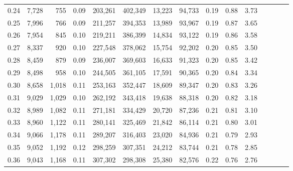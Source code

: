 \begin{tabular}{rrrcrrrrrrrrrrr}
0.24 &   7,728 &     755 &                                       0.09 &  203,261 &  402,349 &   13,223 &   94,733 &  0.19 &  0.88 &                         3.73 \\
0.25 &   7,996 &     766 &                                       0.09 &  211,257 &  394,353 &   13,989 &   93,967 &  0.19 &  0.87 &                         3.65 \\
0.26 &   7,954 &     845 &                                       0.10 &  219,211 &  386,399 &   14,834 &   93,122 &  0.19 &  0.86 &                         3.58 \\
0.27 &   8,337 &     920 &                                       0.10 &  227,548 &  378,062 &   15,754 &   92,202 &  0.20 &  0.85 &                         3.50 \\
0.28 &   8,459 &     879 &                                       0.09 &  236,007 &  369,603 &   16,633 &   91,323 &  0.20 &  0.85 &                         3.42 \\
0.29 &   8,498 &     958 &                                       0.10 &  244,505 &  361,105 &   17,591 &   90,365 &  0.20 &  0.84 &                         3.34 \\
0.30 &   8,658 &   1,018 &                                       0.11 &  253,163 &  352,447 &   18,609 &   89,347 &  0.20 &  0.83 &                         3.26 \\
0.31 &   9,029 &   1,029 &                                       0.10 &  262,192 &  343,418 &   19,638 &   88,318 &  0.20 &  0.82 &                         3.18 \\
0.32 &   8,989 &   1,082 &                                       0.11 &  271,181 &  334,429 &   20,720 &   87,236 &  0.21 &  0.81 &                         3.10 \\
0.33 &   8,960 &   1,122 &                                       0.11 &  280,141 &  325,469 &   21,842 &   86,114 &  0.21 &  0.80 &                         3.01 \\
0.34 &   9,066 &   1,178 &                                       0.11 &  289,207 &  316,403 &   23,020 &   84,936 &  0.21 &  0.79 &                         2.93 \\
0.35 &   9,052 &   1,192 &                                       0.12 &  298,259 &  307,351 &   24,212 &   83,744 &  0.21 &  0.78 &                         2.85 \\
0.36 &   9,043 &   1,168 &                                       0.11 &  307,302 &  298,308 &   25,380 &   82,576 &  0.22 &  0.76 &                         2.76 \\

\end{tabular}
